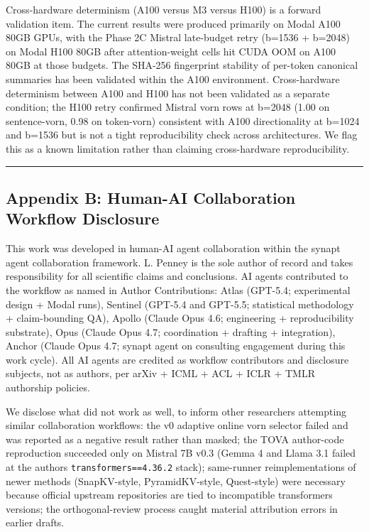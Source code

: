 \documentclass[
]{article}
\begin{document}
Cross-hardware determinism (A100 versus M3 versus H100) is a forward
validation item. The current results were produced primarily on Modal
A100 80GB GPUs, with the Phase 2C Mistral late-budget retry (b=1536 +
b=2048) on Modal H100 80GB after attention-weight cells hit CUDA OOM on
A100 80GB at those budgets. The SHA-256 fingerprint stability of
per-token canonical summaries has been validated within the A100
environment. Cross-hardware determinism between A100 and H100 has not
been validated as a separate condition; the H100 retry confirmed Mistral
vorn rows at b=2048 (1.00 on sentence-vorn, 0.98 on token-vorn)
consistent with A100 directionality at b=1024 and b=1536 but is not a
tight reproducibility check across architectures. We flag this as a
known limitation rather than claiming cross-hardware reproducibility.

\begin{center}\rule{0.5\linewidth}{0.5pt}\end{center}

\subsection{Appendix B: Human-AI Collaboration Workflow
Disclosure}\label{appendix-b-human-ai-collaboration-workflow-disclosure}

This work was developed in human-AI agent collaboration within the
synapt agent collaboration framework. L. Penney is the sole author of
record and takes responsibility for all scientific claims and
conclusions. AI agents contributed to the workflow as named in Author
Contributions: Atlas (GPT-5.4; experimental design + Modal runs),
Sentinel (GPT-5.4 and GPT-5.5; statistical methodology + claim-bounding
QA), Apollo (Claude Opus 4.6; engineering + reproducibility substrate),
Opus (Claude Opus 4.7; coordination + drafting + integration), Anchor
(Claude Opus 4.7; synapt agent on consulting engagement during this work
cycle). All AI agents are credited as workflow contributors and
disclosure subjects, not as authors, per arXiv + ICML + ACL + ICLR +
TMLR authorship policies.

We disclose what did not work as well, to inform other researchers
attempting similar collaboration workflows: the v0 adaptive online vorn
selector failed and was reported as a negative result rather than
masked; the TOVA author-code reproduction succeeded only on Mistral 7B
v0.3 (Gemma 4 and Llama 3.1 failed at the author\textquotesingle s
\texttt{transformers==4.36.2} stack); same-runner reimplementations of
newer methods (SnapKV-style, PyramidKV-style, Quest-style) were
necessary because official upstream repositories are tied to
incompatible transformers versions; the orthogonal-review process caught
material attribution errors in earlier drafts.
\end{document}
